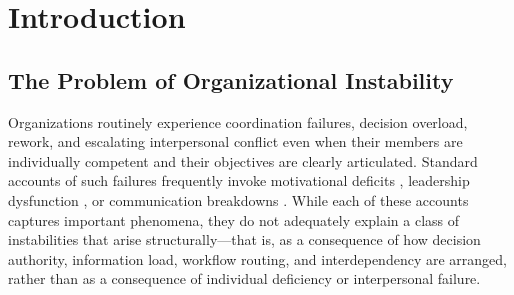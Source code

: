 \documentclass[12pt]{article}
\begin{document}
\begin{abstract}
The framework proposes four architectural layers: \emph{intention architecture}, which
defines what the system is trying to preserve; \emph{decision architecture}, which
defines who has standing to decide; \emph{orchestration architecture}, which defines how
decisions are translated into coordinated action; and \emph{commit architecture}, which
defines whether a specific action remains admissible when it becomes irreversible. It
further distinguishes standing legitimacy from execution-time admissibility. These
algebraic forms are the authors' own formalizations by analogy to physical circuit theory
and are not directly derived from the cited literatures, which are invoked to motivate
the conceptual components rather than to validate the specific functional forms. The
model is extended through Kirchhoff-like network constraints applied to decision
architectures and through analysis of how AI-augmented organizations alter the
flow--resistance--heat balance while dramatically increasing the importance of both
orchestration integrity and commit-time admissibility checks. We conclude with testable
predictions that could validate or refute the framework's structural assumptions, and
with an explicit assessment of model limitations.
\end{abstract}

\tableofcontents
\newpage

\section{Introduction}

\subsection{The Problem of Organizational Instability}

Organizations routinely experience coordination failures, decision overload,
rework, and escalating interpersonal conflict even when their members are
individually competent and their objectives are clearly articulated. Standard
accounts of such failures frequently invoke motivational deficits
\citep{deci1985intrinsic}, leadership dysfunction \citep{yukl2012leadership},
or communication breakdowns \citep{weick1995sensemaking}. While each of these
accounts captures important phenomena, they do not adequately explain a class
of instabilities that arise structurally---that is, as a consequence of how
decision authority, information load, workflow routing, and interdependency are
arranged, rather than as a consequence of individual deficiency or
interpersonal failure.
\end{document}
